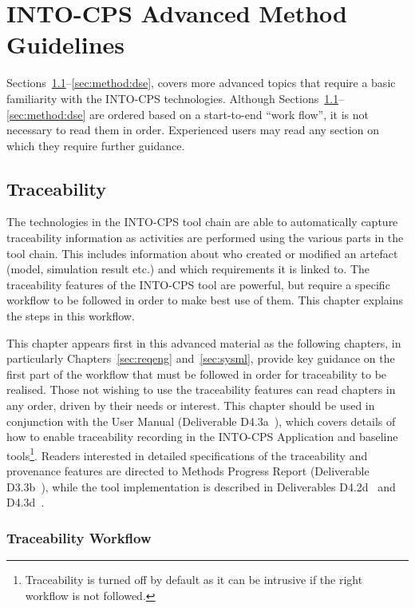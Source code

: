 \section{INTO-CPS Advanced Method Guidelines}
\label{cha:advanced}

Sections~\ref{sec:method:trace}--\ref{sec:method:dse}, covers more advanced topics that require a basic familiarity with the INTO-CPS technologies. Although Sections~\ref{sec:method:trace}--\ref{sec:method:dse} are ordered based on a start-to-end ``work flow'', it is not necessary to read them in order. Experienced users may read any section on which they require further guidance.

\subsection{Traceability}
\label{sec:method:trace}

The technologies in the INTO-CPS tool chain are able to automatically capture traceability information as activities are performed using the various parts in the tool chain. This includes information about who created or modified an artefact (model, simulation result etc.) and which requirements it is linked to. The traceability features of the INTO-CPS tool are powerful, but require a specific workflow to be followed in order to make best use of them. This chapter explains the steps in this workflow.

This chapter appears first in this advanced material as the following chapters, in particularly Chapters~\ref{sec:reqeng} and~\ref{sec:sysml}, provide key guidance on the first part of the workflow that must be followed in order for traceability to be realised. Those not wishing to use the traceability features can read chapters in any order, driven by their needs or interest. This chapter should be used in conjunction with the User Manual (Deliverable D4.3a~\cite{INTOCPSD4.3a}), which covers details of how to enable traceability recording in the INTO-CPS Application and baseline tools\footnote{Traceability is turned off by default as it can be intrusive if the right workflow is not followed.}. Readers interested in detailed specifications of the traceability and provenance features are directed to Methods Progress Report (Deliverable D3.3b~\cite{INTOCPSD3.3b}), while the tool implementation is described in Deliverables D4.2d~\cite{INTOCPSD4.2d} and D4.3d~\cite{INTOCPSD4.3d}.


\subsubsection{Traceability Workflow}

